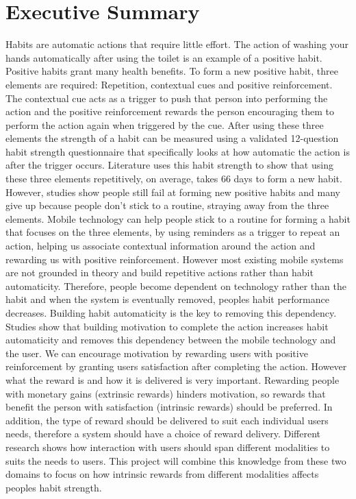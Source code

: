\section*{Executive Summary}

Habits are automatic actions that require little effort. The action of washing your hands automatically after using the toilet is an example of a positive habit. Positive habits grant many health benefits. To form a new positive habit, three elements are required: Repetition, contextual cues and positive reinforcement. The contextual cue acts as a trigger to push that person into performing the action and the positive reinforcement rewards the person encouraging them to perform the action again when triggered by the cue. After using these three elements the strength of a habit can be measured using a validated 12-question habit strength questionnaire that specifically looks at how automatic the action is after the trigger occurs. Literature uses this habit strength to show that using these three elements repetitively, on average, takes 66 days to form a new habit. However, studies show people still fail at forming new positive habits and many give up because people don't stick to a routine, straying away from the three elements.\newline
\newline
Mobile technology can help people stick to a routine for forming a habit that focuses on the three elements, by using reminders as a trigger to repeat an action, helping us associate contextual information around the action and rewarding us with positive reinforcement. However most existing mobile systems are not grounded in theory and build repetitive actions rather than habit automaticity. Therefore, people become dependent on technology rather than the habit and when the system is eventually removed, peoples habit performance decreases.\newline
\newline
Building habit automaticity is the key to removing this dependency. Studies show that building motivation to complete the action increases habit automaticity and removes this dependency between the mobile technology and the user. We can encourage motivation by rewarding users with positive reinforcement by granting users satisfaction after completing the action. However what the reward is and how it is delivered is very important. Rewarding people with monetary gains (extrinsic rewards) hinders motivation, so rewards that benefit the person with satisfaction (intrinsic rewards) should be preferred. In addition, the type of reward should be delivered to suit each individual users needs, therefore a system should have a choice of reward delivery. Different research shows how interaction with users should span different modalities to suits the needs to users. This project will combine this knowledge from these two domains to focus on how intrinsic rewards from different modalities affects peoples habit strength.\newline
